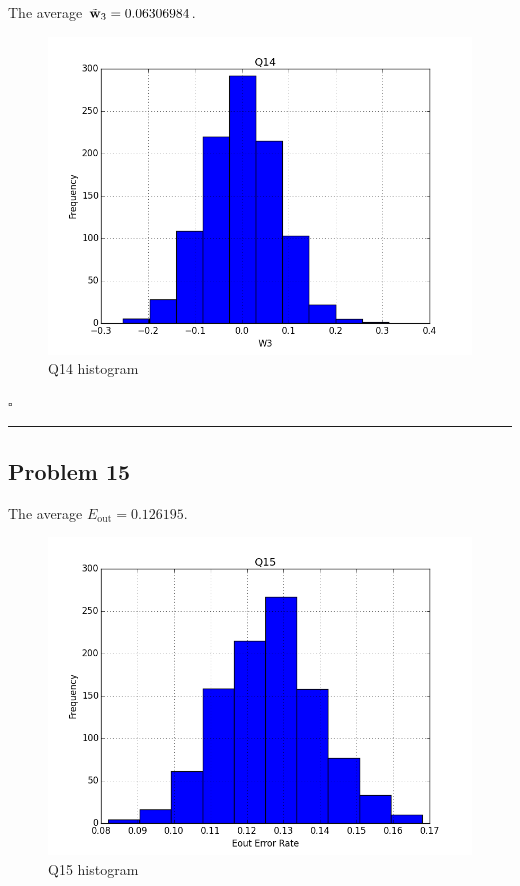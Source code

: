 \documentclass[12pt]{article}
\newcommand*{\QEDB}{\hfill\ensuremath{\square}}
\newcommand{\BF}[1]{{\bf#1}}
\newcommand{\horrule}[1]{\rule{\linewidth}{#1}}
\begin{document}
The average $\tilde{\BF{w}}_{3}={0.06306984}$.
\begin{figure}[h]
	\centering
	\includegraphics[scale=0.3]{Q14.png}
	\caption{Q14 histogram}
	\label{Q14}
\end{figure}

\QEDB

\horrule{0.5pt}

\subsection*{Problem 15}

The average $E_{\text{out}}=0.126195$.
\begin{figure}[h]
	\centering
	\includegraphics[scale=0.3]{Q15.png}
	\caption{Q15 histogram}
	\label{Q15}
\end{figure}
\end{document}
